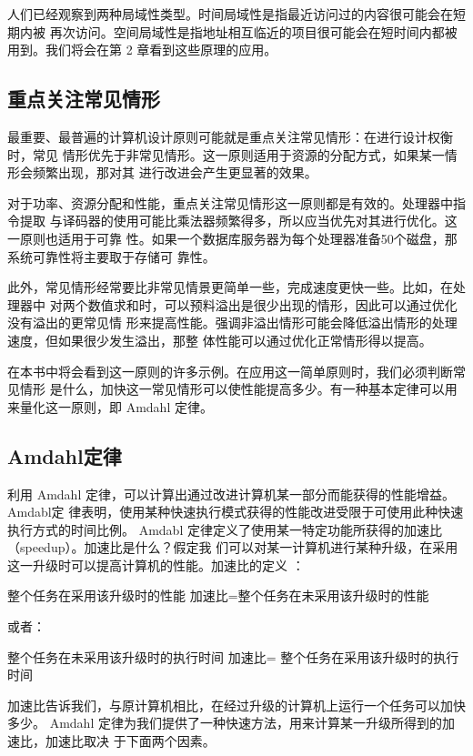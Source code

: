 人们已经观察到两种局域性类型。时间局域性是指最近访问过的内容很可能会在短期内被
再次访问。空间局域性是指地址相互临近的项目很可能会在短时间内都被用到。我们将会在第
2 章看到这些原理的应用。

\subsection{重点关注常见情形}

最重要、最普遍的计算机设计原则可能就是重点关注常见情形：在进行设计权衡时，常见
情形优先于非常见情形。这一原则适用于资源的分配方式，如果某一情形会频繁出现，那对其
进行改进会产生更显著的效果。

对于功率、资源分配和性能，重点关注常见情形这一原则都是有效的。处理器中指令提取
与译码器的使用可能比乘法器频繁得多，所以应当优先对其进行优化。这一原则也适用于可靠
性。如果一个数据库服务器为每个处理器准备50个磁盘，那系统可靠性将主要取于存储可
靠性。

此外，常见情形经常要比非常见情景更简单一些，完成速度更快一些。比如，在处理器中
对两个数值求和时，可以预料溢出是很少出现的情形，因此可以通过优化没有溢出的更常见情
形来提高性能。强调非溢出情形可能会降低溢出情形的处理速度，但如果很少发生溢出，那整
体性能可以通过优化正常情形得以提高。

在本书中将会看到这一原则的许多示例。在应用这一简单原则时，我们必须判断常见情形
是什么，加快这一常见情形可以使性能提高多少。有一种基本定律可以用来量化这一原则，即
Amdahl 定律。

\subsection{Amdahl定律}

利用 Amdahl 定律，可以计算出通过改进计算机某一部分而能获得的性能增益。Amdabl定
律表明，使用某种快速执行模式获得的性能改进受限于可使用此种快速执行方式的时间比例。
Amdabl 定律定义了使用某一特定功能所获得的加速比（speedup）。加速比是什么？假定我
们可以对某一计算机进行某种升级，在采用这一升级时可以提高计算机的性能。加速比的定义 ：

整个任务在采用该升级时的性能
加速比=整个任务在未采用该升级时的性能

或者：

整个任务在未采用该升级时的执行时间
加速比=
整个任务在采用该升级时的执行时间

加速比告诉我们，与原计算机相比，在经过升级的计算机上运行一个任务可以加快多少。
Amdahl 定律为我们提供了一种快速方法，用来计算某一升级所得到的加速比，加速比取决
于下面两个因素。

